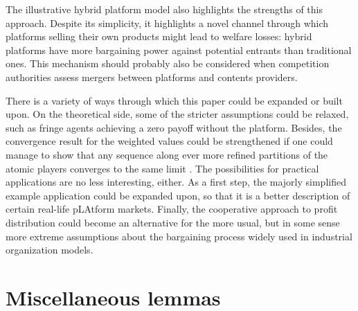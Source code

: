 \documentclass[a4paper]{article}
\begin{document}
The illustrative hybrid platform model also highlights the strengths of this approach.
Despite its simplicity, it highlights a novel channel through which platforms selling their own products might lead to welfare losses: hybrid platforms have more bargaining power against potential entrants than traditional ones.
This mechanism should probably also be considered when competition authorities assess mergers between platforms and contents providers.

There is a variety of ways through which this paper could be expanded or built upon.
On the theoretical side, some of the stricter assumptions could be relaxed, such as fringe agents achieving a zero payoff without the platform.
Besides, the convergence result for the weighted values could be strengthened if one could manage to show that any sequence along ever more refined partitions of the atomic players converges to the same limit \parencite[à la][]{fogelman1980asymptotic}.
The possibilities for practical applications are no less interesting, either.
As a first step, the majorly simplified example application could be expanded upon, so that it is a better description of certain real-life pLAtform markets.
Finally, the cooperative approach to profit distribution could become an alternative for the more usual, but in some sense more extreme assumptions about the bargaining process widely used in industrial organization models.


\appendix

\printbibliography

\section{Miscellaneous lemmas}
\end{document}
